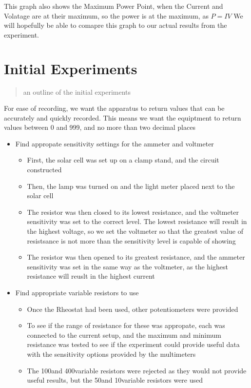 \documentclass{article}
\begin{document}
This graph also shows the Maximum Power Point, when the Current and Volatage are at their maximum, so the power is at the maximum, as $P=IV$
We will hopefully be able to comapre this graph to our actual results from the experiment.

\section{Initial Experiments}
\begin{quote}
an outline of the initial experiments
\end{quote}
For ease of recording, we want the apparatus to return values that can be accurately and quickly recorded. This means we want the equiptment to return values between 0 and 999, and no more than two decimal places
\begin{itemize}
  \item Find appropate sensitivity settings for the ammeter and voltmeter
  \begin{itemize}
    \item First, the solar cell was set up on a clamp stand, and the circuit constructed
    \item Then, the lamp was turned on and the light meter placed next to the solar cell
    \item The resistor was then closed to its lowest resistance, and the voltmeter sensitivity was set to the correct level. The lowest resistance will result in the highest voltage, so we set the voltmeter so that the greatest value of resistsance is not more than the sensitivity level is capable of showing
    \item The resistor was then opened to its greatest resistance, and the ammeter sensitivity was set in the same way as the voltmeter, as the highest resistance will reuslt in the highest current
  \end{itemize}
  \item Find appropriate variable resistors to use
  \begin{itemize}
    \item Once the Rheostat had been used, other potentiometers were provided
    \item To see if the range of resistance for these was appropate, each was connected to the current setup, and the maximum and minimum resistance was tested to see if the experiment could provide useful data with the sensitivity options provided by the multimeters
    \item The 100\Omega and 400\Omega variable resistors were rejected as they would not provide useful results, but the 50\Omega and 10\Omega variable resistors were used
  \end{itemize}

\end{itemize}
\end{document}
